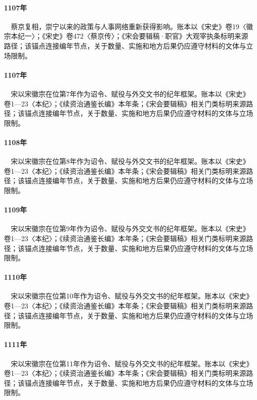 \paragraph{1107年}　蔡京复相，崇宁以来的政策与人事网络重新获得影响。账本以《宋史》卷19〈徽宗本纪一〉；《宋史》卷472〈蔡京传〉；《宋会要辑稿·职官》大观宰执条标明来源路径；该锚点连接编年节点，关于数量、实施和地方后果仍应遵守材料的文体与立场限制。

\paragraph{1107年}　宋以宋徽宗在位第7年作为诏令、赋役与外交文书的纪年框架。账本以《宋史》卷1—23〈本纪〉；《续资治通鉴长编》本年条；《宋会要辑稿》相关门类标明来源路径；该锚点连接编年节点，关于数量、实施和地方后果仍应遵守材料的文体与立场限制。

\paragraph{1108年}　宋以宋徽宗在位第8年作为诏令、赋役与外交文书的纪年框架。账本以《宋史》卷1—23〈本纪〉；《续资治通鉴长编》本年条；《宋会要辑稿》相关门类标明来源路径；该锚点连接编年节点，关于数量、实施和地方后果仍应遵守材料的文体与立场限制。

\paragraph{1109年}　宋以宋徽宗在位第9年作为诏令、赋役与外交文书的纪年框架。账本以《宋史》卷1—23〈本纪〉；《续资治通鉴长编》本年条；《宋会要辑稿》相关门类标明来源路径；该锚点连接编年节点，关于数量、实施和地方后果仍应遵守材料的文体与立场限制。

\paragraph{1110年}　宋以宋徽宗在位第10年作为诏令、赋役与外交文书的纪年框架。账本以《宋史》卷1—23〈本纪〉；《续资治通鉴长编》本年条；《宋会要辑稿》相关门类标明来源路径；该锚点连接编年节点，关于数量、实施和地方后果仍应遵守材料的文体与立场限制。

\paragraph{1111年}　宋以宋徽宗在位第11年作为诏令、赋役与外交文书的纪年框架。账本以《宋史》卷1—23〈本纪〉；《续资治通鉴长编》本年条；《宋会要辑稿》相关门类标明来源路径；该锚点连接编年节点，关于数量、实施和地方后果仍应遵守材料的文体与立场限制。

